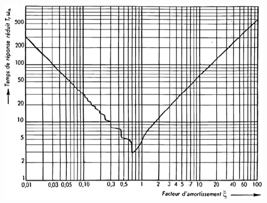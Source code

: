 \documentclass[10pt,fleqn]{article} %
\begin{document}
\begin{multicols}{2}
\begin{center}
\includegraphics[width=.75\linewidth]{images/image18.png}
\end{center}
\fi










\end{multicols}
\end{document}
